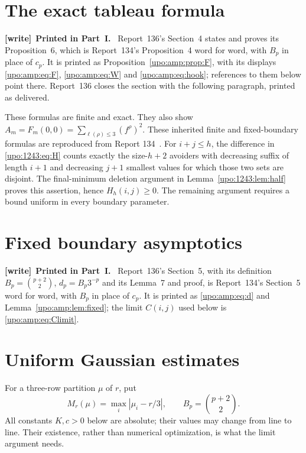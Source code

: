 \documentclass[11pt,letterpaper]{article}
\theoremstyle{remark}\newtheorem{remark}[theorem]{Remark}
\numberwithin{equation}{section}
\newenvironment{writenote}[1][]{\par\smallskip\begingroup\small
 \noindent\textbf{[write]}\if\relax\detokenize{#1}\relax\else~\textbf{#1.}\fi\ }%
 {\par\endgroup\smallskip}
\begin{document}
\section{The exact tableau formula}\label{upo:1243:sec:tableaux}
\begin{writenote}[Printed in Part~I]
Report~136's Section~4 states and proves its Proposition~6, which is Report~134's Proposition~4 word for word, with $B_p$ in place of $c_p$. It is printed as Proposition~\ref{upo:amp:prop:F}, with its displays \eqref{upo:amp:eq:F}, \eqref{upo:amp:eq:W} and \eqref{upo:amp:eq:hook}; references to them below point there. Report~136 closes the section with the following paragraph, printed as delivered.
\end{writenote}
These formulas are finite and exact. They also show
$A_m=F_m(0,0)=\sum_{\ell(\rho)\le3}(f^\rho)^2$.
These inherited finite and fixed-boundary formulas are reproduced from
Report 134~\cite{R134}. For $i+j\le h$, the difference in
\eqref{upo:1243:eq:H} counts exactly the size-$h+2$ avoiders with decreasing
suffix of length $i+1$ and decreasing $j+1$ smallest values for which
those two sets are disjoint. The final-minimum deletion argument in
Lemma~\ref{upo:1243:lem:half} proves this assertion, hence $H_h(i,j)\ge0$.
The remaining argument requires a bound uniform in every boundary parameter.

\section{Fixed boundary asymptotics}\label{upo:1243:sec:fixed}
\begin{writenote}[Printed in Part~I]
Report~136's Section~5, with its definition $B_p=\binom{p+2}2$, $d_p=B_p3^{-p}$ and its Lemma~7 and proof, is Report~134's Section~5 word for word, with $B_p$ in place of $c_p$. It is printed as \eqref{upo:amp:eq:d} and Lemma~\ref{upo:amp:lem:fixed}; the limit $C(i,j)$ used below is \eqref{upo:amp:eq:Climit}.
\end{writenote}
\section{Uniform Gaussian estimates}\label{upo:1243:sec:gaussian}
For a three-row partition $\mu$ of $r$, put
\[M_r(\mu)=\max_i|\mu_i-r/3|,\qquad B_p=\binom{p+2}{2}.\]
All constants $K,c>0$ below are absolute; their values may change from
line to line. Their existence, rather than numerical optimization, is
what the limit argument needs.
\end{document}
